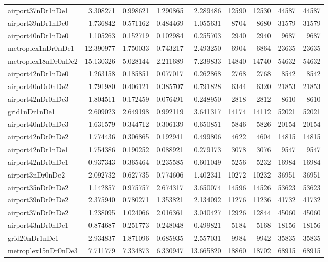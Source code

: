 \begin{longtable}{|l|r|r|r|r|r|r|r|r|}
airport37nDr1nDe1 & 3.308271 & 0.998621 & 1.290865 & 2.289486 & 12590 & 12530 & 44587 & 44587 \\
airport39nDr1nDe0 & 1.736842 & 0.571162 & 0.484469 & 1.055631 & 8704 & 8680 & 31579 & 31579 \\
airport40nDr1nDe0 & 1.105263 & 0.152719 & 0.102984 & 0.255703 & 2940 & 2940 & 9687 & 9687 \\
metroplex1nDr0nDe1 & 12.390977 & 1.750033 & 0.743217 & 2.493250 & 6904 & 6864 & 23635 & 23635 \\
metroplex18nDr0nDe2 & 15.130326 & 5.028144 & 2.211689 & 7.239833 & 14840 & 14740 & 54632 & 54632 \\
airport42nDr1nDe0 & 1.263158 & 0.185851 & 0.077017 & 0.262868 & 2768 & 2768 & 8542 & 8542 \\
airport40nDr0nDe2 & 1.791980 & 0.406121 & 0.385707 & 0.791828 & 6344 & 6320 & 21853 & 21853 \\
airport42nDr0nDe3 & 1.804511 & 0.172459 & 0.076491 & 0.248950 & 2818 & 2812 & 8610 & 8610 \\
grid1nDr1nDe1 & 2.609023 & 2.649198 & 0.992119 & 3.641317 & 14174 & 14112 & 52021 & 52021 \\
airport40nDr0nDe3 & 1.631579 & 0.344712 & 0.306139 & 0.650851 & 5846 & 5826 & 20154 & 20154 \\
airport42nDr0nDe2 & 1.774436 & 0.306865 & 0.192941 & 0.499806 & 4622 & 4604 & 14815 & 14815 \\
airport42nDr1nDe1 & 1.754386 & 0.190252 & 0.088921 & 0.279173 & 3078 & 3076 & 9547 & 9547 \\
airport42nDr0nDe1 & 0.937343 & 0.365464 & 0.235585 & 0.601049 & 5256 & 5232 & 16984 & 16984 \\
airport3nDr0nDe2 & 2.092732 & 0.627735 & 0.774606 & 1.402341 & 10272 & 10232 & 36951 & 36951 \\
airport35nDr0nDe2 & 1.142857 & 0.975757 & 2.674317 & 3.650074 & 14596 & 14526 & 53623 & 53623 \\
airport39nDr0nDe2 & 2.375940 & 0.780271 & 1.353821 & 2.134092 & 11276 & 11236 & 41732 & 41732 \\
airport37nDr0nDe2 & 1.238095 & 1.024066 & 2.016361 & 3.040427 & 12926 & 12844 & 45060 & 45060 \\
airport43nDr0nDe1 & 0.874687 & 0.251773 & 0.248048 & 0.499821 & 5184 & 5168 & 18156 & 18156 \\
grid20nDr1nDe1 & 2.934837 & 1.871096 & 0.685935 & 2.557031 & 9984 & 9942 & 35835 & 35835 \\
metroplex15nDr0nDe3 & 7.711779 & 7.334873 & 6.330947 & 13.665820 & 18860 & 18702 & 68915 & 68915 \\

\end{longtable}
